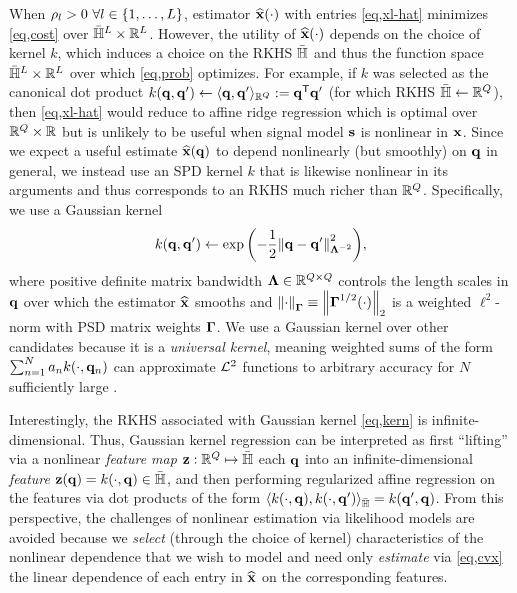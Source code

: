 When $\rho_l>0\,\, \forall l \in \set{1,\dots,L}$, 
estimator $\bmxha{\cdot}$
with entries \eqref{eq,xl-hat} minimizes \eqref{eq,cost}
over ${\bar{\mathbb{H}}}^L \times \mathbb{R}^L$.
However, the utility of $\bmxha{\cdot}$
depends on the choice of kernel $k$,
which induces a choice on the RKHS ${\bar{\mathbb{H}}}$
and thus the function space ${\bar{\mathbb{H}}}^L \times \mathbb{R}^L$
over which \eqref{eq,prob} optimizes.
For example, if $k$ was selected as the canonical dot product 
$k(\mathbf{q},\mathbf{q}') \gets \langle \mathbf{q},\mathbf{q}' \rangle_{\mathbb{R}^{Q}} := \mathbf{q}^{\mathsf{T}} \mathbf{q}'$
(for which RKHS ${\bar{\mathbb{H}}} \gets \mathbb{R}^{Q}$),
then \eqref{eq,xl-hat} would reduce 
to affine ridge regression \cite{hoerl:70:rrb}
which is optimal over $\mathbb{R}^{Q} \times \mathbb{R}$
but is unlikely to be useful 
when signal model $\mathbf{s}$ is nonlinear in $\mathbf{x}$.
Since we expect a useful estimate $\est{\bmx}\paren{\bmq}$ 
to depend nonlinearly (but smoothly) 
on $\mathbf{q}$ in general, 
we instead use 
an SPD kernel $k$ 
that is likewise nonlinear in its arguments
and thus corresponds to an RKHS much richer than $\mathbb{R}^{Q}$. 
Specifically, we use a Gaussian kernel
\begin{align}
	k(\bmq,\bmq') \gets \expa{-\frac{1}{2}{\norm{\bmq-\bmq'}^2_{\bmL^{-2}}}},
	\label{eq,kern}
\end{align}
where positive definite matrix bandwidth $\boldsymbol{\Lambda} \in \mathbb{R}^{Q \times Q}$ 
controls the length scales in $\mathbf{q}$ over which 
the estimator $\widehat{\mathbf{x}}$ smooths
and $\norm{\cdot}_{\bmG} \equiv \norm{\bmG^{1/2}\paren{\cdot}}_2$
is a weighted $\ell^2$-norm
with PSD matrix weights $\boldsymbol{\Gamma}$.
We use a Gaussian kernel
over other candidates
because it is a \emph{universal kernel},
meaning weighted sums of the form 
$\sum_{n=1}^N a_n k\paren{\cdot,\bmq_n}$
can approximate $\mathcal{L}^2$ functions
to arbitrary accuracy
for $N$ sufficiently large
\cite{steinwart:08:svm}.

Interestingly, 
the RKHS associated 
with Gaussian kernel \eqref{eq,kern}
is infinite-dimensional.
Thus, 
Gaussian kernel regression
can be interpreted as 
first ``lifting'' 
via a nonlinear \emph{feature map} 
$\mathbf{z} : \mathbb{R}^{Q} \mapsto {\bar{\mathbb{H}}}$ 
each $\mathbf{q}$ 
into an infinite-dimensional \emph{feature} 
$\bmza{\bmq} = k\paren{\cdot,\bmq} \in \rkhs$,
and then performing regularized affine regression
on the features
via dot products of the form
$\innprod{k\paren{\cdot,\bmq}}{k\paren{\cdot,\bmq'}}_{\rkhs}
	= k\paren{\bmq',\bmq}$.
From this perspective,
the challenges of nonlinear estimation 
via likelihood models
are avoided 
because we \emph{select} 
(through the choice of kernel) 
characteristics of the nonlinear dependence
that we wish to model
and need only \emph{estimate} via \eqref{eq,cvx} 
the linear dependence
of each entry in $\widehat{\mathbf{x}}$ 
on the corresponding features.

